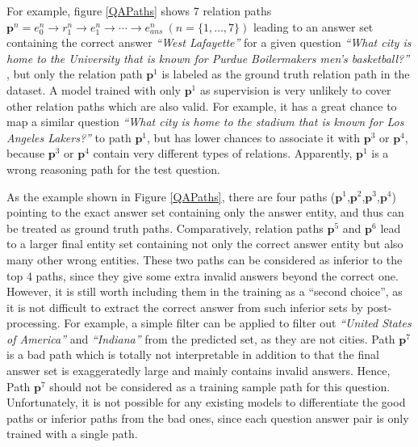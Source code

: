 For example, figure \ref{QAPaths} shows 7 relation paths $\mathbf{p}^n={e^n_0\rightarrow r^n_1 \rightarrow e^n_1 \rightarrow \cdots \rightarrow e^n_{ans}}\ (n=\lbrace 1, \dots, 7 \rbrace)$ leading to an answer set containing the correct answer \textit{``West Lafayette''} for a given question \textit{``What city is home to the University that is known for Purdue Boilermakers men's basketball?''}%
, but only the relation path $\mathbf{p}^1$ is labeled as the ground truth relation path in the dataset. A model trained with only $\mathbf{p}^1$ as supervision is very unlikely to cover other relation paths which are also valid. For example, it has a great chance to map a similar question \textit{``What city is home to the stadium that is known for Los Angeles Lakers?''} to path $\mathbf{p}^1$, but has lower chances to associate it with $\mathbf{p}^3$ or $\mathbf{p}^4$, because $\mathbf{p}^3$ or $\mathbf{p}^4$ contain very different types of relations. Apparently, $\mathbf{p}^1$ is a wrong reasoning path for the test question.

As the example shown in Figure \ref{QAPaths}, there are four paths ($\mathbf{p}^1$,$\mathbf{p}^2$,$\mathbf{p}^3$,$\mathbf{p}^4$) pointing to the exact answer set containing only the answer entity, and thus can be treated as ground truth paths. Comparatively, relation paths $\mathbf{p}^5$ and $\mathbf{p}^6$ lead to a larger final entity set containing not only the correct answer entity but also many other wrong entities. These two paths can be considered as inferior to the top 4 paths, since they give some extra invalid answers beyond the correct one. However, it is still worth including them in the training as a ``second choice'', as it is not difficult to extract the correct answer from such inferior sets by post-processing. For example, a simple filter can be applied to filter out \textit{``United States of America''} and \textit{``Indiana''} from the predicted set, as they are not cities. Path $\mathbf{p}^7$ is a bad path which is totally not interpretable in addition to that the final answer set is exaggeratedly large and mainly contains invalid answers. Hence, Path $\mathbf{p}^7$ should not be considered as a training sample path for this question. Unfortunately, it is not possible for any existing models to differentiate the good paths or inferior paths from the bad ones, since each question answer pair is only trained with a single path.


